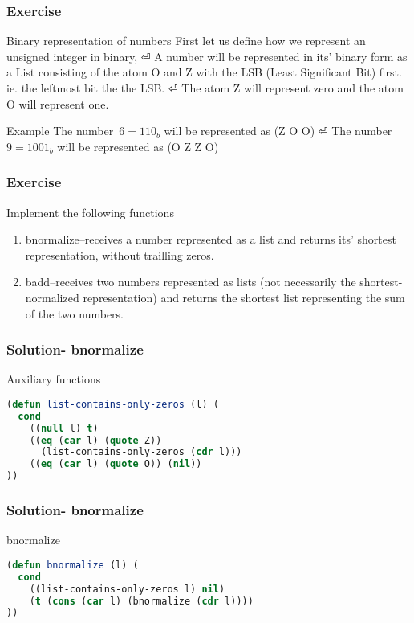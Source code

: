 \documentclass[fleqn]{beamer}
\begin{document}
\begin{frame}
  \frametitle{Exercise}
  \begin{block}{Binary representation of numbers}
    First let us define how we represent an unsigned integer in binary, ⏎
    A number will be represented in its' binary form as a List consisting of the atom O and Z with the LSB (Least Significant Bit) first. ie. the leftmost bit the the LSB. ⏎
    The atom Z will represent zero and the atom O will represent one.
  \end{block}

  \begin{block}{Example}
  The number~$6={110}_b$ will be represented as (Z O O) ⏎
  The number~$9={1001}_b$ will be represented as (O Z Z O)
  \end{block}
\end{frame}

\begin{frame}
  \frametitle{Exercise}
  \begin{block}{Implement the following functions}
    \begin{enumerate}
        \item bnormalize--receives a number represented as a list and returns its' shortest representation, without trailling zeros.
        \item badd--receives two numbers represented as lists (not necessarily the shortest- normalized representation) and returns the shortest list representing the sum of the two numbers.
    \end{enumerate}
  \end{block}
\end{frame}

\begin{frame}[fragile]
  \frametitle{Solution- bnormalize}
  \begin{block}{Auxiliary functions}
    \begin{lstlisting}[language=Lisp]
(defun list-contains-only-zeros (l) (
  cond
    ((null l) t)
    ((eq (car l) (quote Z))
      (list-contains-only-zeros (cdr l)))
    ((eq (car l) (quote O)) (nil))
))
    \end{lstlisting}
  \end{block}
\end{frame}

\begin{frame}[fragile]
  \frametitle{Solution- bnormalize}
  \begin{block}{bnormalize}
    \begin{lstlisting}[language=Lisp]
(defun bnormalize (l) (
  cond
    ((list-contains-only-zeros l) nil)
    (t (cons (car l) (bnormalize (cdr l))))
))
    \end{lstlisting}
  \end{block}
\end{frame}
\end{document}
